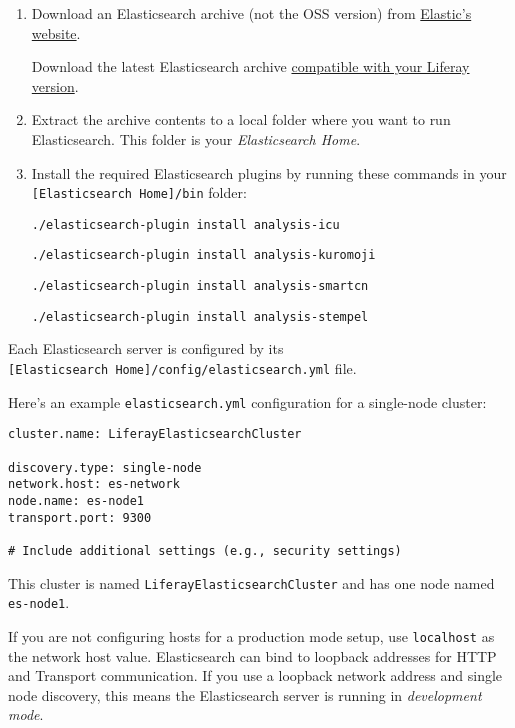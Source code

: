 \begin{enumerate}
\def\labelenumi{\arabic{enumi}.}
\item
  Download an Elasticsearch archive (not the OSS version) from
  \href{https://www.elastic.co}{Elastic's website}.

  Download the latest Elasticsearch archive
  \href{https://help.liferay.com/hc/en-us/articles/360016511651\#Liferay-DXP-7.1}{compatible
  with your Liferay version}.
\item
  Extract the archive contents to a local folder where you want to run
  Elasticsearch. This folder is your \emph{Elasticsearch Home}.
\item
  Install the required Elasticsearch plugins by running these commands
  in your \texttt{{[}Elasticsearch\ Home{]}/bin} folder:

\begin{verbatim}
./elasticsearch-plugin install analysis-icu
\end{verbatim}

\begin{verbatim}
./elasticsearch-plugin install analysis-kuromoji
\end{verbatim}

\begin{verbatim}
./elasticsearch-plugin install analysis-smartcn
\end{verbatim}

\begin{verbatim}
./elasticsearch-plugin install analysis-stempel
\end{verbatim}
\end{enumerate}

Each Elasticsearch server is configured by its
\texttt{{[}Elasticsearch\ Home{]}/config/elasticsearch.yml} file.

Here's an example \texttt{elasticsearch.yml} configuration for a
single-node cluster:

\begin{verbatim}
cluster.name: LiferayElasticsearchCluster

discovery.type: single-node
network.host: es-network
node.name: es-node1
transport.port: 9300

# Include additional settings (e.g., security settings) 
\end{verbatim}

This cluster is named \texttt{LiferayElasticsearchCluster} and has one
node named \texttt{es-node1}.

If you are not configuring hosts for a production mode setup, use
\texttt{localhost} as the network host value. Elasticsearch can bind to
loopback addresses for HTTP and Transport communication. If you use a
loopback network address and single node discovery, this means the
Elasticsearch server is running in \emph{development mode}.


